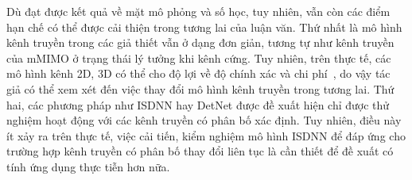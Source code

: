 Dù đạt được kết quả về mặt mô phỏng và số học, tuy nhiên, vẫn còn các điểm hạn chế có thể được cải thiện trong tương lai của luận văn. Thứ nhất là mô hình kênh truyền trong các giả thiết vẫn ở dạng đơn giản, tương tự như kênh truyền của mMIMO ở trạng thái lý tưởng khi kênh cứng. Tuy nhiên, trên thực tế, các mô hình kênh 2D, 3D có thể cho độ lợi về độ chính xác và chi phí~\cite{shaik2021}, do vậy tác giả có thể xem xét đến việc thay đổi mô hình kênh truyền trong tương lai. Thứ hai, các phương pháp như ISDNN hay DetNet được đề xuất hiện chỉ được thử nghiệm hoạt động với các kênh truyền có phân bố xác định. Tuy nhiên, điều này ít xảy ra trên thực tế, việc cải tiến, kiểm nghiệm mô hình ISDNN để đáp ứng cho trường hợp kênh truyền có phân bố thay đổi liên tục là cần thiết để đề xuất có tính ứng dụng thực tiễn hơn nữa.